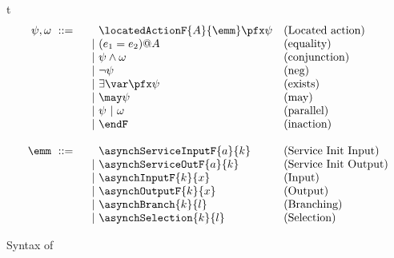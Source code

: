 \begin{myfigure}{t}
$$
\begin{array}{cc}

 \begin{array}{rll}
    \psi, \omega \ ::=\ &\phantom{{}~ | ~{}}
\locatedActionF{A}{\emm}\pfx \psi      & \text{(Located action)}\\
    &~ | ~ (e_1=e_2)@A    & \text{(equality)}\\
    &~ | ~ \psi \land \omega               & \text{(conjunction)}\\
    &~ | ~ \neg \psi                 & \text{(neg)}\\
    &~ | ~ \exists \var\pfx \psi     & \text{(exists)}\\
    &~ | ~ \may \psi                  & \text{(may)}\\
    &~ | ~ \psi ~|~ \omega                    & \text{(parallel)}\\
    &~ | ~ \endF               & \text{(inaction)}
\\\\
    \emm\ ::=\ & \phantom{{}~ | ~{}} \asynchServiceInputF{a}{k}&
    \text{(Service Init Input)}\\
    &~ | ~ \asynchServiceOutF{a}{k}&    \text{(Service Init Output)}\\
    &~ | ~ \asynchInputF{k}{x}&    \text{(Input)}\\
    &~ | ~ \asynchOutputF{k}{x}&    \text{(Output)}\\
    &~ | ~ \asynchBranch{k}{l}&    \text{(Branching)}\\
    &~ | ~ \asynchSelection{k}{l}&    \text{(Selection)}\\
       \end{array}
\end{array}
$$
\caption{Syntax of  \LL }
\label{Logic4Struct:table:LocalLogic}
\end{myfigure}


